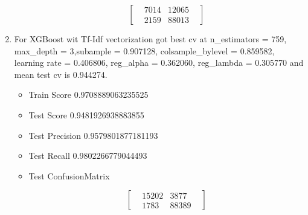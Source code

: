 \documentclass[11pt]{article}
\providecommand{\tightlist}{%
      \setlength{\itemsep}{0pt}\setlength{\parskip}{0pt}}
\begin{document}
\begin{enumerate}
\begin{itemize}
    \begin{equation}
    \begin{bmatrix}
    & 7014 & 12065 &  \\
    & 2159 & 88013 & 
    \end{bmatrix}
    \end{equation}
  \end{itemize}
\item
  For XGBoost wit Tf-Idf vectorization got best cv at n\_estimators =
  759, max\_depth = 3,subample = 0.907128, colsample\_bylevel =
  0.859582, learning rate = 0.406806, reg\_alpha = 0.362060, reg\_lambda
  = 0.305770 and mean test cv is 0.944274.

  \begin{itemize}
  \tightlist
  \item
    Train Score 0.9708889063235525
  \item
    Test Score 0.9481926938883855
  \item
    Test Precision 0.9579801877181193
  \item
    Test Recall 0.9802266779044493
  \item
    Test ConfusionMatrix

    \begin{equation}
    \begin{bmatrix}
    & 15202 & 3877 &  \\
    & 1783 & 88389 & 
    \end{bmatrix}
    \end{equation}
  \end{itemize}
\end{enumerate}


    
    
    
    
\end{document}
